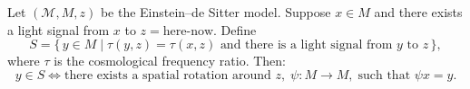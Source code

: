 Let $(\mathcal{M}, M, z)$ be the Einstein--de Sitter model. Suppose $x \in M$ and there exists a light signal from $x$ to $z = \text{here-now}$. Define
$$S = \{\, y \in M \mid \tau(y, z) = \tau(x, z) \text{ and there is a light signal from } y \text{ to } z \,\},$$
where $\tau$ is the cosmological frequency ratio. Then:
$$y \in S \iff \text{there exists a spatial rotation around } z,\; \psi: M \to M,\; \text{such that } \psi x = y.$$
